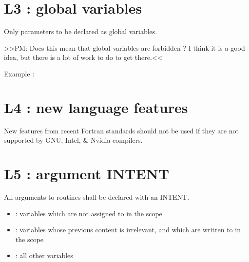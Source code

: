 \documentclass[letterpaper,10pt,english]{sphinxmanual}
\begin{document}
\section{L3 : global variables}
\label{\detokenize{rules/L3:l3-global-variables}}\label{\detokenize{rules/L3::doc}}
Only parameters to be declared as global variables.

\textgreater{}\textgreater{}PM: Does this mean that global variables are forbidden ? I think it is a good idea, but there is a lot of work to do to get there.\textless{}\textless{}

Example :
\def\sphinxLiteralBlockLabel{\label{\detokenize{rules/L3:id1}}}
\begin{sphinxVerbatim}[commandchars=\\\{\}]

      
       

\end{sphinxVerbatim}


\section{L4 : new language features}
\label{\detokenize{rules/L4:l4-new-language-features}}\label{\detokenize{rules/L4::doc}}
New features from recent Fortran standards should not be
used if they are not supported by GNU, Intel, \& Nvidia compilers.


\section{L5 : argument INTENT}
\label{\detokenize{rules/L5:l5-argument-intent}}\label{\detokenize{rules/L5::doc}}
All arguments to routines shall be declared with an INTENT.
\begin{itemize}
\item {} 
 : variables which are not assigned to in the scope

\item {} 
 : variables whose previous content is irrelevant, and which are written to in the scope

\item {} 
 : all other variables

\end{itemize}
\end{document}
